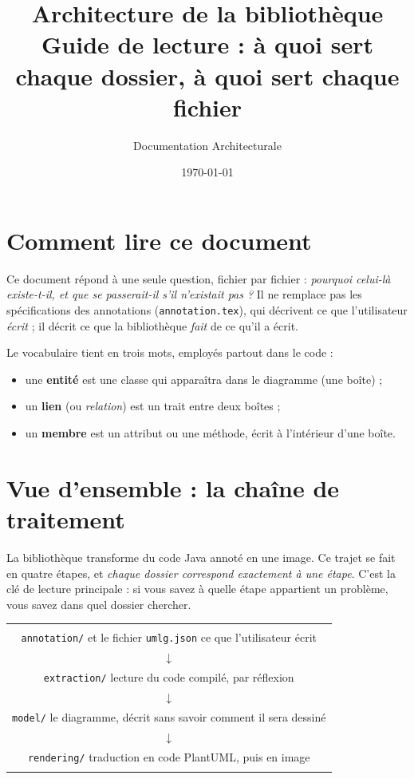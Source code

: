 \documentclass[12pt, a4paper]{article}
\title{\textbf{Architecture de la bibliothèque} \\
       \large Guide de lecture : à quoi sert chaque dossier, à quoi sert chaque fichier}
\author{Documentation Architecturale}
\date{\today}
\begin{document}
\maketitle
\tableofcontents
\newpage

\section{Comment lire ce document}

Ce document répond à une seule question, fichier par fichier : \emph{pourquoi celui-là
existe-t-il, et que se passerait-il s'il n'existait pas ?} Il ne remplace pas les
spécifications des annotations (\texttt{annotation.tex}), qui décrivent ce que l'utilisateur
\emph{écrit} ; il décrit ce que la bibliothèque \emph{fait} de ce qu'il a écrit.

Le vocabulaire tient en trois mots, employés partout dans le code :

\begin{itemize}
  \item une \textbf{entité} est une classe qui apparaîtra dans le diagramme (une boîte) ;
  \item un \textbf{lien} (ou \emph{relation}) est un trait entre deux boîtes ;
  \item un \textbf{membre} est un attribut ou une méthode, écrit à l'intérieur d'une boîte.
\end{itemize}

\section{Vue d'ensemble : la chaîne de traitement}

La bibliothèque transforme du code Java annoté en une image. Ce trajet se fait en quatre
étapes, et \emph{chaque dossier correspond exactement à une étape}. C'est la clé de lecture
principale : si vous savez à quelle étape appartient un problème, vous savez dans quel dossier
chercher.

\begin{center}
\begin{tabular}{c}
\hline
\\
\texttt{annotation/} \; et le fichier \texttt{umlg.json} \quad ce que l'utilisateur écrit \\
$\downarrow$ \\
\texttt{extraction/} \quad lecture du code compilé, par réflexion \\
$\downarrow$ \\
\texttt{model/} \quad le diagramme, décrit sans savoir comment il sera dessiné \\
$\downarrow$ \\
\texttt{rendering/} \quad traduction en code PlantUML, puis en image \\
\\
\hline
\end{tabular}
\end{center}
\end{document}
